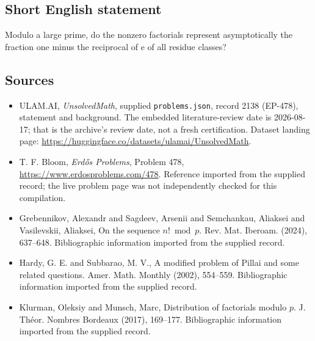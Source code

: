 \documentclass[11pt,a4paper]{article}
\begin{document}
\subsection{Short English statement}

Modulo a large prime, do the nonzero factorials represent asymptotically the fraction one minus the reciprocal of e of all residue classes?

\subsection{Sources}

{\small

\begin{itemize}

\item[\hypertarget{source:2138:1}{S1}] ULAM.AI, \emph{UnsolvedMath}, supplied \texttt{problems.json}, record 2138 (EP-478), statement and background. The embedded literature-review date is 2026-08-17; that is the archive’s review date, not a fresh certification. Dataset landing page: \url{https://huggingface.co/datasets/ulamai/UnsolvedMath}.

\item[\hypertarget{source:2138:2}{S2}] T. F. Bloom, \emph{Erdős Problems}, Problem 478, \url{https://www.erdosproblems.com/478}. Reference imported from the supplied record; the live problem page was not independently checked for this compilation.

\item[\hypertarget{source:2138:3}{S3}] Grebennikov, Alexandr and Sagdeev, Arsenii and Semchankau, Aliaksei and Vasilevskii, Aliaksei, On the sequence {$n! \bmod p$}. Rev. Mat. Iberoam. (2024), 637--648. Bibliographic information imported from the supplied record.

\item[\hypertarget{source:2138:4}{S4}] Hardy, G. E. and Subbarao, M. V., A modified problem of Pillai and some related questions. Amer. Math. Monthly (2002), 554--559. Bibliographic information imported from the supplied record.

\item[\hypertarget{source:2138:5}{S5}] Klurman, Oleksiy and Munsch, Marc, Distribution of factorials modulo {$p$}. J. Th\'{e}or. Nombres Bordeaux (2017), 169--177. Bibliographic information imported from the supplied record.

\end{itemize}

}

\label{end:2138}
\end{document}
